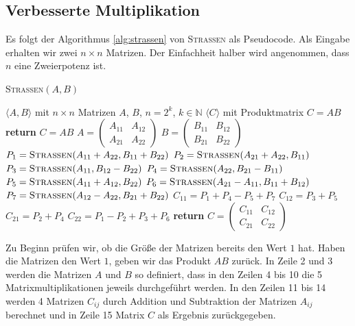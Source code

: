 \documentclass{report}
\numberwithin{equation}{section}
\begin{document}
\subsection{Verbesserte Multiplikation}
Es folgt der Algorithmus \ref{alg:strassen} von \textsc{Strassen}  als Pseudocode. Als Eingabe erhalten wir zwei $n \times n$ Matrizen. Der Einfachheit halber wird angenommen, dass $n$ eine Zweierpotenz ist.
\begin{algorithm}
	\caption{\textsc{Strassen}$(A, B)$}
	\label{alg:strassen}
	\begin{algorithmic}[1]
		\Require $\langle A, B \rangle$ mit $n \times n$ Matrizen $A$, $B$, $n = 2^k$, $k \in \mathbb{N}$
		\Ensure $\langle C \rangle$ mit Produktmatrix $C = AB$
		 \textbf{return} $C = AB$
		\EndIf
		\State $A = \begin{pmatrix} A_{11} & A_{12} \\ A_{21} & A_{22} \end{pmatrix}$
		\State $B = \begin{pmatrix} B_{11} & B_{12} \\ B_{21} & B_{22} \end{pmatrix}$
		\State $P_1 = \textsc{Strassen}(A_{11} + A_{22}, B_{11} + B_{22})$
		\State $P_2 = \textsc{Strassen}(A_{21} + A_{22}, B_{11})$
		\State $P_3 = \textsc{Strassen}(A_{11}, B_{12} - B_{22})$
		\State $P_4 = \textsc{Strassen}(A_{22}, B_{21} - B_{11})$
		\State $P_5 = \textsc{Strassen}(A_{11} + A_{12}, B_{22})$
		\State $P_6 = \textsc{Strassen}(A_{21} - A_{11}, B_{11} + B_{12})$
		\State $P_7 = \textsc{Strassen}(A_{12} - A_{22}, B_{21} + B_{22})$
		\State $C_{11} = P_1 + P_4 - P_5 + P_7$
		\State $C_{12} = P_3 + P_5$
		\State $C_{21} = P_2 + P_4$
		\State $C_{22} = P_1 - P_2 + P_3 + P_6$
		\State \textbf{return} $C = \begin{pmatrix} C_{11} & C_{12} \\ C_{21} & C_{22} \end{pmatrix}$
	\end{algorithmic}
\end{algorithm}
Zu Beginn prüfen wir, ob die Größe der Matrizen bereits den Wert $1$ hat. Haben die Matrizen den Wert $1$, geben wir das Produkt $A B$ zurück. In Zeile 2 und 3 werden die Matrizen $A$ und $B$ so definiert, dass in den Zeilen 4 bis 10 die 5 Matrixmultiplikationen jeweils durchgeführt werden. In den Zeilen 11 bis 14 werden 4 Matrizen $C_{ij}$ durch Addition und Subtraktion der Matrizen $A_{ij}$ berechnet und in Zeile 15 Matrix $C$ als Ergebnis zurückgegeben.
\end{document}
